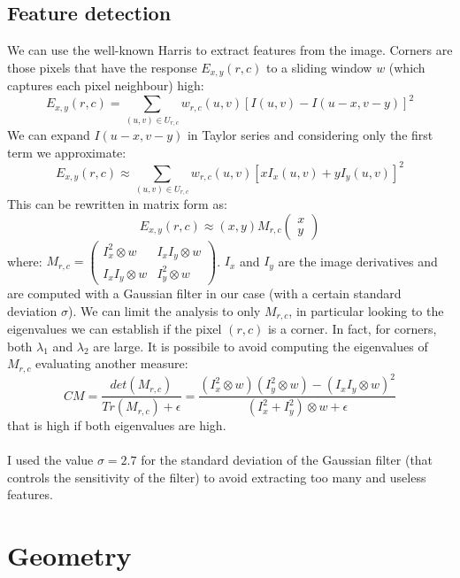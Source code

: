 \documentclass{article}
\begin{document}
\newpage
\subsection{Feature detection}
We can use the well-known Harris to extract features from the image. Corners are those pixels that have the response $E_{x,y}(r,c)$ to a sliding window $w$ (which captures each pixel neighbour) high:
$$ E_{x,y}(r,c) = \sum_{(u,v) \in U_{r,c}} w_{r,c}(u,v) [I(u,v) - I(u-x,v-y)]^2 $$
We can expand $ I(u-x,v-y)$ in Taylor series and considering only the first term we approximate:
$$ E_{x,y}(r,c) \approx \sum_{(u,v) \in U_{r,c}} w_{r,c}(u,v) [xI_x(u,v) + yI_y(u,v)]^2 $$
This can be rewritten in matrix form as:
$$ E_{x,y}(r,c) \approx (x,y) M_{r,c} \begin{pmatrix} x \\ y \end{pmatrix} $$
where: $ M_{r,c} = \begin{pmatrix}
I_x^2 \otimes w & I_x I_y \otimes w \\
I_x I_y \otimes w & I_y^2 \otimes w
\end{pmatrix} $. $I_x$ and $I_y$ are the image derivatives and are computed with a Gaussian filter in our case (with a certain standard deviation $\sigma$).
We can limit the analysis to only $M_{r,c}$, in particular looking to the eigenvalues we can establish if the pixel $(r,c)$ is a corner. In fact, for corners, both $\lambda_1$ and $\lambda_2$ are large. It is possibile to avoid computing the eigenvalues of $M_{r,c}$ evaluating another measure:
$$ CM = \frac{det(M_{r,c})}{Tr(M_{r,c}) + \epsilon} = \frac{(I_x^2 \otimes w)(I_y^2 \otimes w) - (I_x I_y \otimes w)^2}{(I_x^2 + I_y^2) \otimes w + \epsilon} $$
that is high if both eigenvalues are high.
\\
\\
I used the value $\sigma = 2.7$ for the standard deviation of the Gaussian filter (that controls the sensitivity of the filter) to avoid extracting too many and useless features.

\newpage
\section{Geometry}
\end{document}

